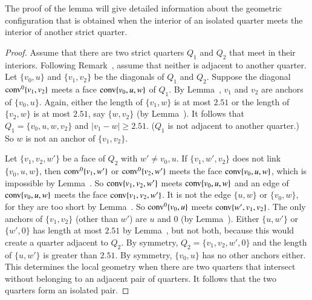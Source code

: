\begin{tarskidata}
\begin{tarski}
The proof of the lemma will give detailed information about the
geometric configuration that is obtained when the interior of an
isolated quarter meets the interior of another strict quarter.

\begin{proof}  Assume that there are two strict quarters $Q_1$ and $Q_2$
that meet in their interiors.  Following Remark~,
assume that neither is adjacent to another quarter. Let $\{v_0,u\}$
and $\{v_1,v_2\}$ be the diagonals of $Q_1$ and $Q_2$. Suppose the
diagonal ${\operatorname{conv}}^0\{v_1,v_2\}$ meets a face ${\operatorname{conv}}\{v_0,u,w\}$ of $Q_1$.
By Lemma~, $v_1$ and $v_2$ are anchors of
$\{v_0,u\}$. Again, either the length of $\{v_1,w\}$ is at most
$2.51$ or the length of $\{v_2,w\}$ is at most $2.51$, say
$\{w,v_2\}$ (by Lemma~). It follows
that
    $Q_1=\{v_0,u,w,v_2\}$ and $|v_1-w|\ge2.51$.
($Q_1$ is not adjacent to another quarter.)  So $w$ is not an
anchor of $\{v_1,v_2\}$.

Let $\{v_1,v_2,w'\}$ be a face of $Q_2$ with $w'\ne v_0,u$. If
$\{v_1,w',v_2\}$ does not link $\{v_0,u,w\}$, then ${\operatorname{conv}}^0\{v_1,w'\}$ or
${\operatorname{conv}}^0\{v_2,w'\}$ meets the face ${\operatorname{conv}}\{v_0,u,w\}$, which is
impossible by Lemma~. So
${\operatorname{conv}}\{v_1,v_2,w'\}$  meets ${\operatorname{conv}}\{v_0,u,w\}$
and an edge of ${\operatorname{conv}}\{v_0,u,w\}$
meets the face ${\operatorname{conv}}\{v_1,v_2,w'\}$. It is not the edge
$\{u,w\}$ or $\{v_0,w\}$, for they are too short by
Lemma~.  So ${\operatorname{conv}}^0\{v_0,u\}$ meets 
${\operatorname{conv}}\{w',v_1,v_2\}$. The only anchors of $\{v_1,v_2\}$ (other
than $w'$) are $u$ and $0$ (by Lemma~).
Either $\{u,w'\}$ or $\{w',0\}$ has length at most $2.51$ by
Lemma~, but not both, because this
would create a quarter adjacent to $Q_2$. By symmetry,
$Q_2=\{v_1,v_2,w',0\}$ and the length of $\{u,w'\}$ is greater
than $2.51$. By symmetry, $\{v_0,u\}$ has no other anchors either.
This determines the local geometry when there are two quarters
that intersect without belonging to an adjacent pair of quarters.
It follows that the two quarters form an isolated pair.
\end{proof}



\end{tarski}
\end{tarskidata}
